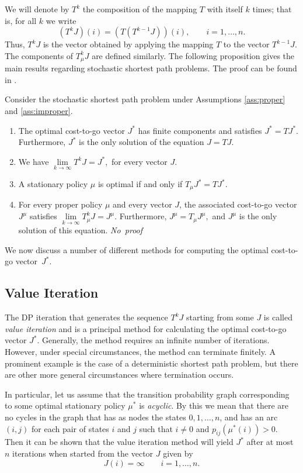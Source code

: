We will denote by $T^k$ the composition of the mapping $T$ with itself $k$ times; that is, for all $k$ we write 
$$(T^kJ)(i)=\left (T(T^{k-1}J)\right)(i), \qquad i=1,\ldots,n.$$
Thus, $T^kJ$ is the vector obtained by applying the mapping $T$ to the vector $T^{k-1}J$. 
The components of $T^k_\mu J$ are defined similarly. The following proposition gives the main results regarding stochastic shortest path problems. The proof can be found in \cite{Bertsekas95}.
\begin{theorem} \label{the:stochastic}
Consider the stochastic shortest path problem under Assumptions \ref{ass:proper} and \ref{ass:improper}.
\begin{enumerate}
\item The optimal cost-to-go vector $J^*$ has finite components and satisfies 
$J^*=TJ^*.$
Furthermore, $J^*$ is the only solution of the equation $J=TJ$.
\item We have 
$\lim \limits_{k \rightarrow \infty} T^kJ = J^*,$
for every vector $J$.
\item A stationary policy $\mu$ is optimal if and only if 
$T_\mu J^* = TJ^*.$
\item For every proper policy $\mu$ and every vector $J$, the associated cost-to-go vector $J^\mu$ satisfies
$\lim \limits_{k \rightarrow \infty} T^k_\mu J = J^\mu.$
Furthermore,
$J^\mu = T_\mu J^\mu,$
and $J^\mu$ is the only solution of this equation. \hfill {\it No~proof}
\end{enumerate}
\end{theorem}

We now discuss a number of different methods for computing the optimal cost-to-go vector~$J^*$.






\subsection{Value Iteration} \label{sec:dp:valueiteration}
The DP iteration that generates the sequence $T^kJ$ starting from some $J$ is called \emph{value iteration} and is a principal method for calculating the optimal cost-to-go vector $J^*$. Generally, the method requires an infinite number of iterations. However, under special circumstances, the method can terminate finitely. A prominent example is the case of a deterministic shortest path problem, but there are other more general circumstances where termination occurs. 

In particular, let us assume that the transition probability graph corresponding to some optimal stationary policy $\mu^*$ is \emph{acyclic}. By this we mean that there are no cycles in the graph that has as nodes the states $0,1,\ldots,n$, and has an arc $(i,j)$ for each pair of states $i$ and $j$ such that $i \neq 0$ and $p_{ij}\left(\mu^*(i)\right) > 0$. Then it can be shown that the value iteration method will yield $J^*$ after at most $n$ iterations when started from the vector $J$ given by
$$J(i) = \infty \qquad i = 1,\ldots,n.$$

